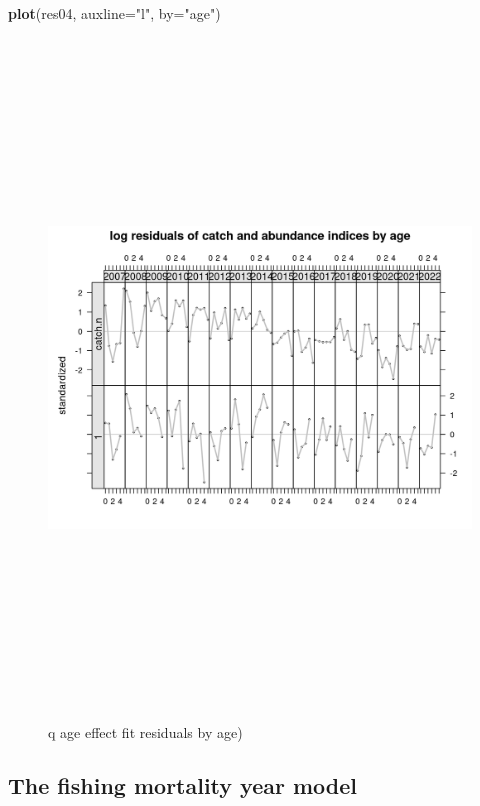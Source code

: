 \documentclass[
]{book}
\newenvironment{Shaded}{\begin{snugshade}}{\end{snugshade}}
\newcommand{\AttributeTok}[1]{\textcolor[rgb]{0.13,0.29,0.53}{#1}}
\newcommand{\FunctionTok}[1]{\textcolor[rgb]{0.13,0.29,0.53}{\textbf{#1}}}
\newcommand{\NormalTok}[1]{#1}
\newcommand{\StringTok}[1]{\textcolor[rgb]{0.31,0.60,0.02}{#1}}
\begin{document}
\begin{Shaded}
\begin{Highlighting}[]
\FunctionTok{plot}\NormalTok{(res04, }\AttributeTok{auxline=}\StringTok{"l"}\NormalTok{, }\AttributeTok{by=}\StringTok{"age"}\NormalTok{)}
\end{Highlighting}
\end{Shaded}

\begin{figure}
\includegraphics[width=25cm,height=18cm,angle=90]{_bookdown_files/_main_files/figure-html/fqageresbyage-1} \caption{q age effect fit residuals by age)}\label{fig:fqageresbyage}
\end{figure}

\hypertarget{the-fishing-mortality-year-model}{%
\subsection{The fishing mortality year model}\label{the-fishing-mortality-year-model}}
\end{document}
